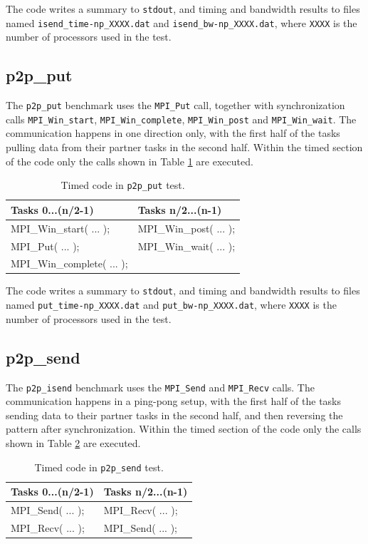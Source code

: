 \documentclass[10pt,a4paper]{report}
\begin{document}
The code writes a summary to \verb+stdout+, and timing and bandwidth results to files named \verb+isend_time-np_XXXX.dat+ and \verb+isend_bw-np_XXXX.dat+, where \verb+XXXX+ is the number of processors used in the test.

\FloatBarrier
\subsection{p2p\_put}
The \verb+p2p_put+ benchmark uses the \verb+MPI_Put+ call, together with synchronization calls \verb+MPI_Win_start+, \verb+MPI_Win_complete+, \verb+MPI_Win_post+ and \verb+MPI_Win_wait+. The communication happens in one direction only, with the first half of the tasks pulling data from their partner tasks in the second half. Within the timed section of the code only the calls shown in Table \ref{tab:put} are executed.

\begin{table}[ht]
\centering
\caption{Timed code in \texttt{p2p\_put} test.}
\label{tab:put}
\begin{tabular}{|l|l|}
\hline
\bf{Tasks 0...(n/2-1)}	   & \bf{Tasks n/2...(n-1)}\\\hline
MPI\_Win\_start( ... );    & MPI\_Win\_post( ... );\\
MPI\_Put( ... );           & MPI\_Win\_wait( ... );\\
MPI\_Win\_complete( ... ); & \\\hline
\end{tabular}
\end{table}

The code writes a summary to \verb+stdout+, and timing and bandwidth results to files named \verb+put_time-np_XXXX.dat+ and \verb+put_bw-np_XXXX.dat+, where \verb+XXXX+ is the number of processors used in the test.

\FloatBarrier
\subsection{p2p\_send}
The \verb+p2p_isend+ benchmark uses the \verb+MPI_Send+ and \verb+MPI_Recv+ calls. The communication happens in a ping-pong setup, with the first half of the tasks sending data to their partner tasks in the second half, and then reversing the pattern after synchronization. Within the timed section of the code only the calls shown in Table \ref{tab:send} are executed.

\begin{table}[ht]
\centering
\caption{Timed code in \texttt{p2p\_send} test.}
\label{tab:send}
\begin{tabular}{|l|l|}
\hline
\bf{Tasks 0...(n/2-1)}	& \bf{Tasks n/2...(n-1)}\\\hline
MPI\_Send( ... );       & MPI\_Recv( ... );\\
MPI\_Recv( ... );       & MPI\_Send( ... );\\\hline
\end{tabular}
\end{table}
\end{document}
